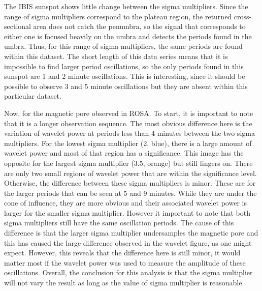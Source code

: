     The IBIS sunspot shows little change between the sigma multipliers.
    Since the range of sigma multipliers correspond to the plateau region, the returned cross-sectional area does not catch the penumbra, so the signal that corresponds to either one is focused heavily on the umbra and detects the periods found in the umbra.
    Thus, for this range of sigma multipliers, the same periods are found within this dataset.
    The short length of this data series means that it is impossible to find larger period oscillations, so the only periods found in this sunspot are 1 and 2 minute oscillations.
    This is interesting, since it should be possible to observe 3 and 5 minute oscillations but they are absent within this particular dataset.
       
    Now, for the magnetic pore observed in ROSA.
    To start, it is important to note that it is a longer observation sequence.
    The most obvious difference here is the variation of wavelet power at periods less than 4 minutes between the two sigma multipliers. 
    For the lowest sigma multiplier (2, blue), there is a large amount of wavelet power and most of that region has a significance. 
    This image has the opposite for the largest sigma multiplier (3.5, orange) but still lingers on.
    There are only two small regions of wavelet power that are within the significance level.
    Otherwise, the difference between these sigma multipliers is minor.
    These are for the larger periods that can be seen at 5 and 9 minutes.
    While they are under the cone of influence, they are more obvious and their associated wavelet power is larger for the smaller sigma multiplier.
    However it important to note that both sigma multipliers still have the same oscillation periods.
    The cause of this difference is that the larger sigma multiplier undersamples the magnetic pore and this has caused the large difference observed in the wavelet figure, as one might expect.
    However, this reveals that the difference here is still minor, it would matter most if the wavelet power was used to measure the amplitude of these oscillations.
    Overall, the conclusion for this analysis is that the sigma multiplier will not vary the result as long as the value of sigma multiplier is reasonable.
